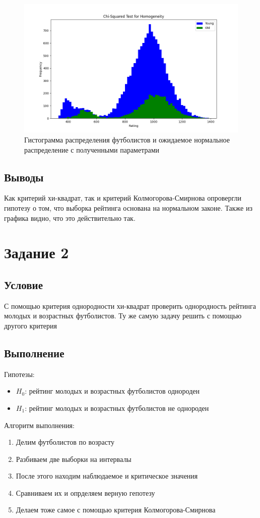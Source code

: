 \documentclass{article}
\begin{document}
\begin{figure}[H]
      \centering
      \includegraphics[width=1\linewidth]{../python/task1.png}
      \caption{Гистограмма распределения футболистов и ожидаемое нормальное распределение с полученными параметрами}\label{fig:figure}
\end{figure}
\subsection{Выводы}
Как критерий хи-квадрат, так и критерий Колмогорова-Смирнова опровергли гипотезу о том, что выборка рейтинга основана на нормальном законе. Также из графика видно, что это действительно так.

\section{Задание 2}
\subsection{Условие}
С помощью критерия однородности хи-квадрат проверить однородность рейтинга молодых и возрастных футболистов. Ту же самую задачу решить с помощью другого критерия
\subsection{Выполнение}
Гипотезы:
\begin{itemize}
      \item $H_0$: рейтинг молодых и возрастных футболистов однороден
      \item $H_1$: рейтинг молодых и возрастных футболистов не однороден 
\end{itemize}
Алгоритм выполнения:
\begin{enumerate}
      \item Делим футболистов по возрасту
      \item Разбиваем две выборки на интервалы
      \item После этого находим наблюдаемое и критическое значения
      \item Сравниваем их и опрделяем верную гепотезу
      \item Делаем тоже самое с помощью критерия Колмогорова-Смирнова
\end{enumerate}
\end{document}
